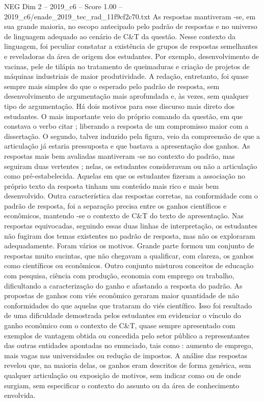 \begin{textsample}{NEG Dim 2 – 2019\_c6 – Score 1.00 – 2019\_c6/enade\_2019\_tec\_rad\_11f9cf2c70.txt}
As respostas mantiveram -se, em sua grande maioria, no escopo antecipado pelo padrão de respostas e no universo de linguagem adequado ao cenário de C\&T da questão.
Nesse contexto da linguagem, foi peculiar constatar a existência de grupos de respostas semelhantes e reveladoras da área de origem dos estudantes.
Por exemplo, desenvolvimento de vacinas, pele de tilápia no tratamento de queimaduras e criação de projetos de máquinas industriais de maior produtividade.
A redação, entretanto, foi quase sempre mais simples do que o esperado pelo padrão de resposta, sem desenvolvimento de argumentação mais aprofundada e, às vezes, sem qualquer tipo de argumentação.
Há dois motivos para esse discurso mais direto dos estudantes.
O mais importante veio do próprio comando da questão, em que constava o verbo citar ; liberando a resposta de um compromisso maior com a dissertação.
O segundo, talvez induzido pela figura, veio da compreensão de que a articulação já estaria pressuposta e que bastava a apresentação dos ganhos.
As respostas mais bem avaliadas mantiveram -se no contexto do padrão, mas seguiram duas vertentes ; nelas, os estudantes consideravam ou não a articulação como pré-estabelecida.
Aquelas em que os estudantes fizeram a associação no próprio texto da resposta tinham um conteúdo mais rico e mais bem desenvolvido.
Outra característica das respostas corretas, na conformidade com o padrão de resposta, foi a separação precisa entre os ganhos científicos e econômicos, mantendo -se o contexto de C\&T do texto de apresentação.
Nas respostas equivocadas, seguindo essas duas linhas de interpretação, os estudantes não fugiram dos temas existentes no padrão de resposta, mas não os exploraram adequadamente.
Foram vários os motivos.
Grande parte formou um conjunto de respostas muito sucintas, que não chegavam a qualificar, com clareza, os ganhos como científicos ou econômicos.
Outro conjunto misturou conceitos de educação com pesquisa, ciência com produção, economia com emprego ou trabalho, dificultando a caracterização do ganho e afastando a resposta do padrão.
As propostas de ganhos com viés econômico geraram maior quantidade de não conformidades do que aquelas que trataram do viés científico.
Isso foi resultado de uma dificuldade demostrada pelos estudantes em evidenciar o vínculo do ganho econômico com o contexto de C\&T, quase sempre apresentado com exemplos de vantagem obtida ou concedida pelo setor público a representantes das outras entidades apontadas no enunciado, tais como : aumento de emprego, mais vagas nas universidades ou redução de impostos.
A análise das respostas revelou que, na maioria delas, os ganhos eram descritos de forma genérica, sem qualquer articulação ou exposição de motivos, sem indicar como ou de onde surgiam, sem especificar o contexto do assunto ou da área de conhecimento envolvida.

\end{textsample}

